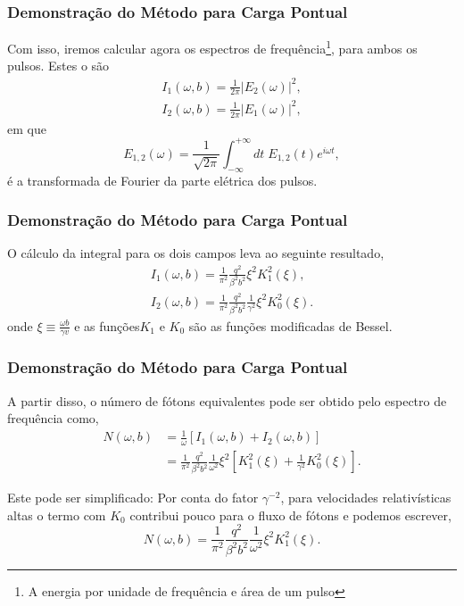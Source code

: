 \documentclass[xcolor=dvipsnames]{beamer}
\begin{document}
\begin{frame}
	\frametitle{Demonstração do Método para Carga Pontual}
	Com isso, iremos calcular agora os espectros de frequência\footnote{A
	energia por unidade de frequência e área de um pulso}, para ambos os
	pulsos. Estes o são
	\begin{gather}
		I_1(\omega , b) = \frac{1}{2\pi} |E_2 (\omega) |^2 ,\\
		I_2 (\omega , b) = \frac{1}{2\pi} |E_1 (\omega)|^2,
	\end{gather}
	em que 
	\begin{equation}
		E_{1,2} (\omega) = \frac{1}{\sqrt{2\pi}} \int _{-\infty}^{+\infty}
		dt \; E _{1,2} (t) e^{i\omega t},
	\end{equation}
	é a transformada de Fourier da parte elétrica dos pulsos.
\end{frame}

\begin{frame}
	\frametitle{Demonstração do Método para Carga Pontual}
	O cálculo da integral para os dois campos leva ao seguinte resultado,
	\begin{gather}
		I_1 (\omega , b) = \frac{1}{\pi ^2} \frac{q^2}{ \beta ^2 b^2}  
		\xi ^2 K_1 ^2 \left( \xi \right), \\
		I_2 (\omega , b) = \frac{1}{\pi ^2} \frac{q^2}{\beta ^2 b^2 }
		\frac{1}{\gamma ^2} \xi^2 K_0 ^2 \left( \xi \right).
	\end{gather}
	onde $\displaystyle \xi \equiv \frac {\omega b}{\gamma v}$ e as
	funções$K_1$ e $K_0$ são as funções modificadas de Bessel.
\end{frame}

\begin{frame}
	\frametitle{Demonstração do Método para Carga Pontual}
	A partir disso, o número de fótons equivalentes pode ser obtido pelo
	espectro de frequência como,
	\begin{equation}
		\begin{split}
		N(\omega , b) &= \frac{1}{\omega} \left[ I_1 (\omega , b) + I_2(\omega
			, b) \right]\\
			&= \frac{1}{\pi ^2} \frac{q^2} {\beta ^2 b^2}
			\frac{1}{\omega ^2} \xi ^2 \left[K_1^2 (\xi ) + \frac{1}{\gamma ^2}
			K_0 ^2 (\xi ) \right]. \label{eq_EP-SPEC}
		\end{split}
	\end{equation}
	\begin{block}{Este pode ser simplificado:}
		Por conta do fator $\gamma ^{-2}$, para velocidades relativísticas
		altas o termo com $K_0$ contribui pouco para o fluxo de fótons e
		podemos escrever,
		\begin{equation}
			N(\omega , b) = \frac{1}{\pi ^2} \frac{q^2} {\beta ^2 b^2}
			\frac{1}{\omega ^2} \xi ^2 K_1 ^2 (\xi).
		\end{equation}
	\end{block}
\end{frame}
\end{document}

